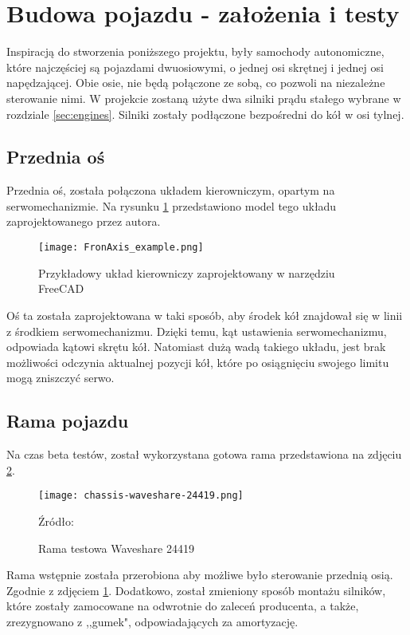 \section{Budowa pojazdu - założenia i testy}
    Inspiracją do stworzenia poniższego projektu, były samochody autonomiczne, które najczęściej są pojazdami dwuosiowymi, o jednej osi skrętnej i jednej osi napędzającej.
    Obie osie, nie będą połączone ze sobą, co pozwoli na niezależne sterowanie nimi.
    W projekcie zostaną użyte dwa silniki prądu stałego wybrane w rozdziale \ref{sec:engines}.
    Silniki zostały podłączone bezpośredni do kół w osi tylnej.
    \subsection{Przednia oś}
        Przednia oś, została połączona układem kierowniczym, opartym na serwomechanizmie.
        Na rysunku \ref{fig:frontAxis_model} przedstawiono model tego układu zaprojektowanego przez autora.

        \begin{figure}[!ht]
            \centering
            \texttt{[image: FronAxis\_example.png]}
            \caption{Przykładowy układ kierowniczy zaprojektowany w narzędziu FreeCAD}
            \label{fig:frontAxis_model}
        \end{figure}
        Oś ta została zaprojektowana w taki sposób, aby środek kół znajdował się w linii z środkiem serwomechanizmu.
        Dzięki temu, kąt ustawienia serwomechanizmu, odpowiada kątowi skrętu kół.
        Natomiast dużą wadą takiego układu, jest brak możliwości odczynia aktualnej pozycji kół, które po osiągnięciu swojego limitu mogą zniszczyć serwo.

    \subsection{Rama pojazdu}
    Na czas beta testów, został wykorzystana gotowa rama przedstawiona na zdjęciu \ref{fig:test_chassis}.
    \begin{figure}[!ht]
        \centering
        \texttt{[image: chassis-waveshare-24419.png]}
        \caption{Rama testowa Waveshare 24419}
        Źródło:  \cite{chassis_waveshare}
        \label{fig:test_chassis}
    \end{figure}

    Rama wstępnie została przerobiona aby możliwe było sterowanie przednią osią. Zgodnie z zdjęciem \ref{fig:frontAxis_model}.
    Dodatkowo, został zmieniony sposób montażu silników, które zostały zamocowane na odwrotnie do zaleceń producenta, a także, zrezygnowano z ,,gumek", odpowiadających za amortyzację.


